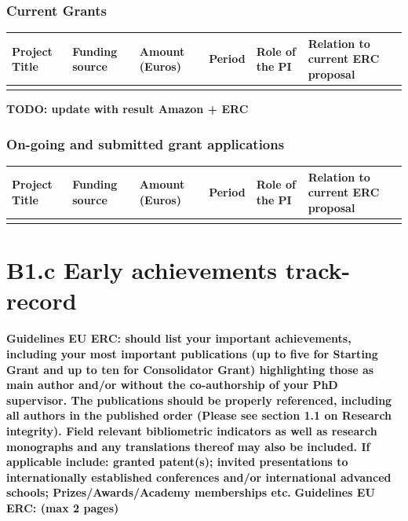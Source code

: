 \documentclass[11pt]{report}
\newcommand{\TODO}[1]{{\color{red}\textbf{TODO: #1}}}
\newcommand{\eu}[1]{{\color{teal}\textbf{Guidelines EU ERC: #1}}}
\begin{document}
\subsection{Current Grants}

\begin{tabular}{@{}llllll@{}}
\toprule
\textbf{Project Title} & \textbf{Funding source} & \textbf{Amount (Euros)} & \textbf{Period} & \textbf{Role of the PI} & \textbf{Relation to current  ERC proposal} \\ \midrule
                       &                         &                         &                 &                         &                                            \\ \bottomrule
\end{tabular}

\TODO{update with result Amazon + ERC}

\subsection{On-going and submitted grant applications}

\begin{tabular}{@{}llllll@{}}
\toprule
\textbf{Project Title} & \textbf{Funding source} & \textbf{Amount (Euros)} & \textbf{Period} & \textbf{Role of the PI} & \textbf{Relation to current  ERC proposal} \\ \midrule
                       &                         &                         &                 &                         &                                            \\ \bottomrule
\end{tabular}




\newpage
\chapter{B1.c Early achievements track-record}\label{early-achievements-track-record}

\eu{should list your important achievements,
including your most important publications (up to five for Starting Grant and up to ten for
Consolidator Grant) highlighting those as main author and/or without the co-authorship of your PhD
supervisor. The publications should be properly referenced, including all authors in the published
order (Please see section 1.1 on Research integrity). Field relevant bibliometric indicators as well as
research monographs and any translations thereof may also be included. If applicable include:
granted patent(s); invited presentations to internationally established conferences and/or
international advanced schools; Prizes/Awards/Academy memberships etc.}
\eu{(max 2 pages)}
\end{document}
